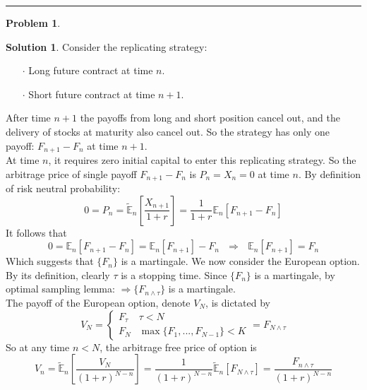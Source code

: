 \documentclass[a4paper, 10pt]{article}
\theoremstyle{definition}
\newtheorem{problem}{Problem}
\theoremstyle{hSol}
\newtheorem*{solution}{Solution}
\begin{document}
\noindent\rule{16cm}{0.4pt}
\begin{problem} 
\end{problem}
\begin{solution} Consider the replicating strategy:
\begin{itemize}
  \item[$\cdot$] Long future contract at time $n$.
  \item[$\cdot$] Short future contract at time $n+1$.
\end{itemize}
After time $n+1$ the payoffs from long and short position cancel out, and the delivery of stocks at maturity also cancel out. So the strategy has only one payoff: $F_{n+1}-F_{n}$ at time $n+1$. \\
At time $n$, it requires zero initial capital to enter this replicating strategy. So the arbitrage price of single payoff $F_{n+1}-F_{n}$ is $P_n=X_n = 0$ at time $n$. By definition of risk neutral probability:
\begin{equation}
  0 = P_n = \tilde{\mathbb{E}}_n\left[\frac{X_{n+1}}{1+r}\right] = \frac{1}{1+r} \mathbb{E}_n\left[F_{n+1}-F_n\right]
\end{equation}
It follows that
\begin{equation}
  0 = \mathbb{E}_n\left[F_{n+1}-F_n\right] = \mathbb{E}_n\left[F_{n+1}\right] - F_n ~~~\Rightarrow ~~~\mathbb{E}_n\left[F_{n+1}\right] = F_n
\end{equation}
Which suggests that $\{F_n\}$ is a martingale. 
We now consider the European option. By its definition, clearly $\tau$ is a stopping time. Since $\{F_n\}$ is a martingale, by optimal sampling lemma: $\Rightarrow \{F_{n\wedge \tau}\}$ is a martingale. \\
The payoff of the European option, denote $V_N$, is dictated by
\begin{equation}
  V_N = \begin{cases}
  F_{\tau} & \tau < N\\
  F_N & \max \{F_1, ..., F_{N-1}\} < K 
  \end{cases} = F_{N\wedge \tau}
\end{equation}
So at any time $n<N$, the arbitrage free price of option is
\begin{equation}
  V_n = \tilde{\mathbb{E}}_n\left[\frac{V_N}{(1+r)^{N-n}}\right] = \frac{1}{(1+r)^{N-n}} \tilde{\mathbb{E}}_n\left[F_{N\wedge \tau}\right] = \frac{F_{n\wedge \tau}}{(1+r)^{N-n}}
\end{equation}

\end{solution}
\end{document}
